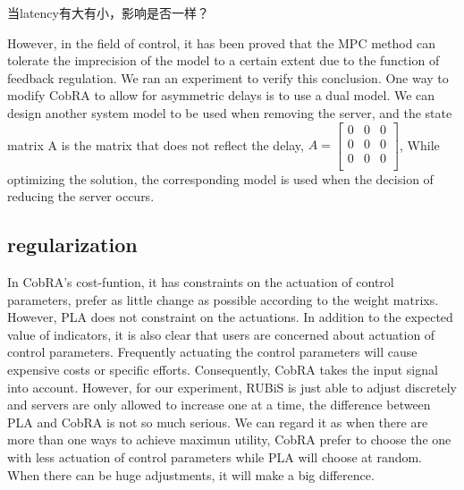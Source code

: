 \documentclass[sigconf]{acmart}
\begin{document}
当latency有大有小，影响是否一样？

However, in the field of control, it has been proved that the MPC method can tolerate the imprecision of the model to a certain extent due to the function of feedback regulation.
We ran an experiment to verify this conclusion.
One way to modify CobRA to allow for asymmetric delays is to use a dual model.
We can design another system model to be used when removing the server, and the state matrix A is the matrix that does not reflect the delay, $A={\left[\begin{array}{ccc}
	0&0&0\\
	0&0&0\\
	0&0&0\\
	\end{array}
	\right]
}$, While optimizing the solution, the corresponding model is used when the decision of reducing the server occurs.
\subsection{regularization}
In CobRA's cost-funtion, it has constraints on the actuation of control parameters, prefer as little change as possible according to the weight matrixs. However, PLA does not constraint on the actuations. In addition to the expected value of indicators, it is also clear that users are concerned about actuation of control parameters. Frequently actuating the control parameters will cause expensive costs or specific efforts. Consequently, CobRA takes the input signal into account. However, for our experiment, RUBiS is just able to adjust discretely and servers are only allowed to increase one at a time, the difference between PLA and CobRA is not so much serious. We can regard it as when there are more than one ways to achieve maximun utility, CobRA prefer to choose the one with less actuation of control parameters while PLA will choose at random. When there can be huge adjustments, it will make a big difference.
\end{document}
